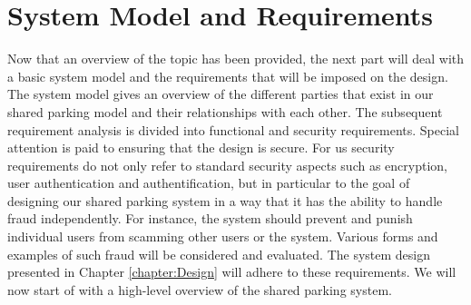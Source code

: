 \chapter{System Model and Requirements}
\label{ch:System Model and Requirements}
Now that an overview of the topic has been provided, the next part will deal with a basic system model and the requirements that will be imposed on the design. The system model gives an overview of the different parties that exist in our shared parking model and their relationships with each other. The subsequent requirement analysis is divided into functional and security requirements. Special attention is paid to ensuring that the design is secure. For us security requirements do not only refer to standard security aspects such as encryption, user authentication and authentification, but in particular to the goal of designing our shared parking system in a way that it has the ability to handle fraud independently. For instance, the system should prevent and punish individual users from scamming other users or the system. Various forms and examples of such fraud will be considered and evaluated. The system design presented in Chapter \ref{chapter:Design} will adhere to these requirements. We will now start of with a high-level overview of the shared parking system.

